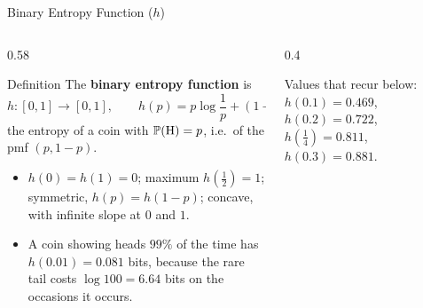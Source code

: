 \begin{frame}{Binary Entropy Function ($h$)}
  \small
  \begin{columns}[T]
    \begin{column}{0.58\textwidth}
      \begin{block}{Definition}
        The \textbf{binary entropy function} is
        \[
          h\colon[0,1]\to[0,1],\qquad h(p)=p\log\frac1p+(1-p)\log\frac1{1-p},
        \]
        the entropy of a coin with $\mathbb{P}(\text{H})=p$, i.e.\ of the pmf $(p,1-p)$.
      \end{block}
      \begin{itemize}
        \item $h(0)=h(1)=0$; maximum $h(\tfrac12)=1$; symmetric, $h(p)=h(1-p)$; concave, with infinite slope at $0$ and $1$.
        \item A coin showing heads $99\%$ of the time has $h(0.01)=0.081$ bits, because the rare tail costs $\log100=6.64$ bits on the occasions it occurs.
      \end{itemize}
    \end{column}
    \begin{column}{0.4\textwidth}
      \centering
      \par\smallskip
      {\footnotesize Values that recur below: $h(0.1)=0.469$, $h(0.2)=0.722$, $h(\tfrac14)=0.811$, $h(0.3)=0.881$.}
    \end{column}
  \end{columns}
\end{frame}

